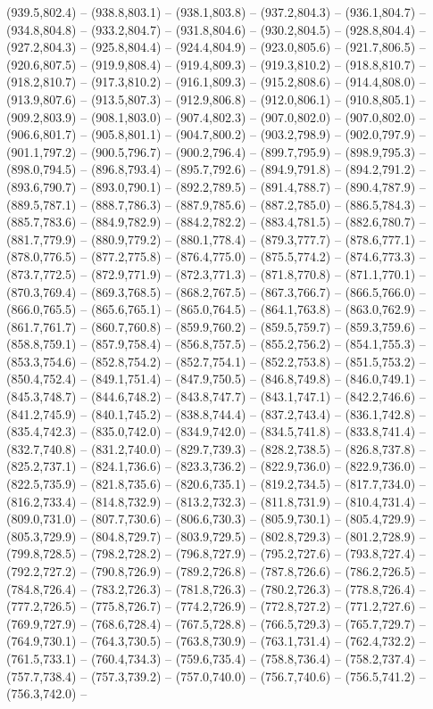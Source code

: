 (939.5,802.4) -- (938.8,803.1) -- (938.1,803.8) -- (937.2,804.3) -- (936.1,804.7) -- (934.8,804.8) -- (933.2,804.7) -- (931.8,804.6) -- (930.2,804.5) -- (928.8,804.4) -- (927.2,804.3) -- (925.8,804.4) -- (924.4,804.9) -- (923.0,805.6) -- (921.7,806.5) -- (920.6,807.5) -- (919.9,808.4) -- (919.4,809.3) -- (919.3,810.2) -- (918.8,810.7) -- (918.2,810.7) -- (917.3,810.2) -- (916.1,809.3) -- (915.2,808.6) -- (914.4,808.0) -- (913.9,807.6) -- (913.5,807.3) -- (912.9,806.8) -- (912.0,806.1) -- (910.8,805.1) -- (909.2,803.9) -- (908.1,803.0) -- (907.4,802.3) -- (907.0,802.0) -- (907.0,802.0) -- (906.6,801.7) -- (905.8,801.1) -- (904.7,800.2) -- (903.2,798.9) -- (902.0,797.9) -- (901.1,797.2) -- (900.5,796.7) -- (900.2,796.4) -- (899.7,795.9) -- (898.9,795.3) -- (898.0,794.5) -- (896.8,793.4) -- (895.7,792.6) -- (894.9,791.8) -- (894.2,791.2) -- (893.6,790.7) -- (893.0,790.1) -- (892.2,789.5) -- (891.4,788.7) -- (890.4,787.9) -- (889.5,787.1) -- (888.7,786.3) -- (887.9,785.6) -- (887.2,785.0) -- (886.5,784.3) -- (885.7,783.6) -- (884.9,782.9) -- (884.2,782.2) -- (883.4,781.5) -- (882.6,780.7) -- (881.7,779.9) -- (880.9,779.2) -- (880.1,778.4) -- (879.3,777.7) -- (878.6,777.1) -- (878.0,776.5) -- (877.2,775.8) -- (876.4,775.0) -- (875.5,774.2) -- (874.6,773.3) -- (873.7,772.5) -- (872.9,771.9) -- (872.3,771.3) -- (871.8,770.8) -- (871.1,770.1) -- (870.3,769.4) -- (869.3,768.5) -- (868.2,767.5) -- (867.3,766.7) -- (866.5,766.0) -- (866.0,765.5) -- (865.6,765.1) -- (865.0,764.5) -- (864.1,763.8) -- (863.0,762.9) -- (861.7,761.7) -- (860.7,760.8) -- (859.9,760.2) -- (859.5,759.7) -- (859.3,759.6) -- (858.8,759.1) -- (857.9,758.4) -- (856.8,757.5) -- (855.2,756.2) -- (854.1,755.3) -- (853.3,754.6) -- (852.8,754.2) -- (852.7,754.1) -- (852.2,753.8) -- (851.5,753.2) -- (850.4,752.4) -- (849.1,751.4) -- (847.9,750.5) -- (846.8,749.8) -- (846.0,749.1) -- (845.3,748.7) -- (844.6,748.2) -- (843.8,747.7) -- (843.1,747.1) -- (842.2,746.6) -- (841.2,745.9) -- (840.1,745.2) -- (838.8,744.4) -- (837.2,743.4) -- (836.1,742.8) -- (835.4,742.3) -- (835.0,742.0) -- (834.9,742.0) -- (834.5,741.8) -- (833.8,741.4) -- (832.7,740.8) -- (831.2,740.0) -- (829.7,739.3) -- (828.2,738.5) -- (826.8,737.8) -- (825.2,737.1) -- (824.1,736.6) -- (823.3,736.2) -- (822.9,736.0) -- (822.9,736.0) -- (822.5,735.9) -- (821.8,735.6) -- (820.6,735.1) -- (819.2,734.5) -- (817.7,734.0) -- (816.2,733.4) -- (814.8,732.9) -- (813.2,732.3) -- (811.8,731.9) -- (810.4,731.4) -- (809.0,731.0) -- (807.7,730.6) -- (806.6,730.3) -- (805.9,730.1) -- (805.4,729.9) -- (805.3,729.9) -- (804.8,729.7) -- (803.9,729.5) -- (802.8,729.3) -- (801.2,728.9) -- (799.8,728.5) -- (798.2,728.2) -- (796.8,727.9) -- (795.2,727.6) -- (793.8,727.4) -- (792.2,727.2) -- (790.8,726.9) -- (789.2,726.8) -- (787.8,726.6) -- (786.2,726.5) -- (784.8,726.4) -- (783.2,726.3) -- (781.8,726.3) -- (780.2,726.3) -- (778.8,726.4) -- (777.2,726.5) -- (775.8,726.7) -- (774.2,726.9) -- (772.8,727.2) -- (771.2,727.6) -- (769.9,727.9) -- (768.6,728.4) -- (767.5,728.8) -- (766.5,729.3) -- (765.7,729.7) -- (764.9,730.1) -- (764.3,730.5) -- (763.8,730.9) -- (763.1,731.4) -- (762.4,732.2) -- (761.5,733.1) -- (760.4,734.3) -- (759.6,735.4) -- (758.8,736.4) -- (758.2,737.4) -- (757.7,738.4) -- (757.3,739.2) -- (757.0,740.0) -- (756.7,740.6) -- (756.5,741.2) -- (756.3,742.0) -- 